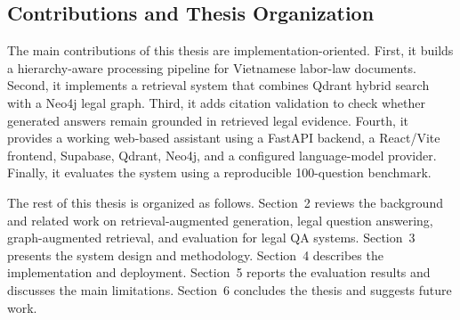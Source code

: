 \subsection{Contributions and Thesis Organization}
The main contributions of this thesis are implementation-oriented. First, it builds a hierarchy-aware processing pipeline for Vietnamese labor-law documents. Second, it implements a retrieval system that combines Qdrant hybrid search with a Neo4j legal graph. Third, it adds citation validation to check whether generated answers remain grounded in retrieved legal evidence. Fourth, it provides a working web-based assistant using a FastAPI backend, a React/Vite frontend, Supabase, Qdrant, Neo4j, and a configured language-model provider. Finally, it evaluates the system using a reproducible 100-question benchmark.

The rest of this thesis is organized as follows. Section~2 reviews the background and related work on retrieval-augmented generation, legal question answering, graph-augmented retrieval, and evaluation for legal QA systems. Section~3 presents the system design and methodology. Section~4 describes the implementation and deployment. Section~5 reports the evaluation results and discusses the main limitations. Section~6 concludes the thesis and suggests future work.

